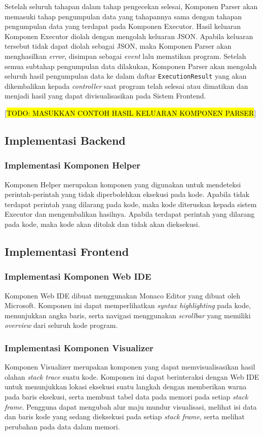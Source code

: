 Setelah seluruh tahapan dalam tahap pengecekan selesai, Komponen Parser akan memasuki tahap pengumpulan data yang tahapannya sama dengan tahapan pengumpulan data yang terdapat pada Komponen Executor. Hasil keluaran Komponen Executor diolah dengan mengolah keluaran JSON. Apabila keluaran tersebut tidak dapat diolah sebagai JSON, maka Komponen Parser akan menghasilkan \textit{error}, disimpan sebagai \textit{event} lalu mematikan program. Setelah semua subtahap pengumpulan data dilakukan, Komponen Parser akan mengolah seluruh hasil pengumpulan data ke dalam daftar \verb|ExecutionResult| yang akan dikembalikan kepada \textit{controller} saat program telah selesai atau dimatikan dan menjadi hasil yang dapat divisualisasikan pada Sistem Frontend.

  [\hl{TODO: MASUKKAN CONTOH HASIL KELUARAN KOMPONEN PARSER}]

\subsection{Implementasi Backend}
\subsubsection{Implementasi Komponen Helper}
Komponen Helper merupakan komponen yang digunakan untuk mendeteksi perintah-perintah yang tidak diperbolehkan eksekusi pada kode. Apabila tidak terdapat perintah yang dilarang pada kode, maka kode diteruskan kepada sistem Executor dan mengembalikan hasilnya. Apabila terdapat perintah yang dilarang pada kode, maka kode akan ditolak dan tidak akan dieksekusi.


\subsection{Implementasi Frontend}

\subsubsection{Implementasi Komponen Web IDE}
Komponen Web IDE dibuat menggunakan Monaco Editor yang dibuat oleh Microsoft. Komponen ini dapat memperlihatkan \textit{syntax highlighting} pada kode, menunjukkan angka baris, serta navigasi menggunakan \textit{scrollbar} yang memiliki \textit{overview} dari seluruh kode program.

\subsubsection{Implementasi Komponen Visualizer}
Komponen Visualizer merupakan komponen yang dapat memvisualisasikan hasil olahan \textit{stack trace} suatu kode. Komponen ini dapat berinteraksi dengan Web IDE untuk menunjukkan lokasi eksekusi suatu langkah dengan memberikan warna pada baris eksekusi, serta membuat tabel data pada memori pada setiap \textit{stack frame}. Pengguna dapat mengubah alur maju mundur visualisasi, melihat isi data dan baris kode yang sedang dieksekusi pada setiap \textit{stack frame}, serta melihat perubahan pada data dalam memori.


